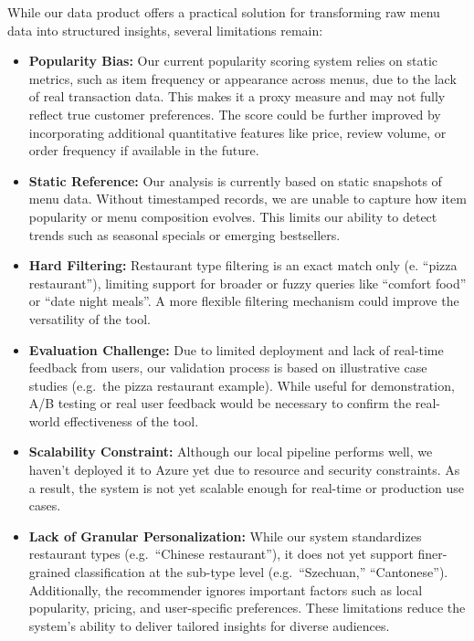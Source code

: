 \documentclass[
  11pt,
  a4paper,
  DIV=11,
  numbers=noendperiod]{scrartcl}
\providecommand{\tightlist}{%
  \setlength{\itemsep}{0pt}\setlength{\parskip}{0pt}}\usepackage{longtable,booktabs,array}
\begin{document}
While our data product offers a practical solution for transforming raw
menu data into structured insights, several limitations remain:

\begin{itemize}
\tightlist
\item
  \textbf{Popularity Bias:} Our current popularity scoring system relies
  on static metrics, such as item frequency or appearance across menus,
  due to the lack of real transaction data. This makes it a proxy
  measure and may not fully reflect true customer preferences. The score
  could be further improved by incorporating additional quantitative
  features like price, review volume, or order frequency if available in
  the future.
\item
  \textbf{Static Reference:} Our analysis is currently based on static
  snapshots of menu data. Without timestamped records, we are unable to
  capture how item popularity or menu composition evolves. This limits
  our ability to detect trends such as seasonal specials or emerging
  bestsellers.
\item
  \textbf{Hard Filtering:} Restaurant type filtering is an exact match
  only (e. ``pizza restaurant''), limiting support for broader or fuzzy
  queries like ``comfort food'' or ``date night meals''. A more flexible
  filtering mechanism could improve the versatility of the tool.
\item
  \textbf{Evaluation Challenge:} Due to limited deployment and lack of
  real-time feedback from users, our validation process is based on
  illustrative case studies (e.g.~the pizza restaurant example). While
  useful for demonstration, A/B testing or real user feedback would be
  necessary to confirm the real-world effectiveness of the tool.
\item
  \textbf{Scalability Constraint:} Although our local pipeline performs
  well, we haven't deployed it to Azure yet due to resource and security
  constraints. As a result, the system is not yet scalable enough for
  real-time or production use cases.
\item
  \textbf{Lack of Granular Personalization:} While our system
  standardizes restaurant types (e.g.~``Chinese restaurant''), it does
  not yet support finer-grained classification at the sub-type level
  (e.g.~``Szechuan,'' ``Cantonese''). Additionally, the recommender
  ignores important factors such as local popularity, pricing, and
  user-specific preferences. These limitations reduce the system's
  ability to deliver tailored insights for diverse audiences.
\end{itemize}
\end{document}
